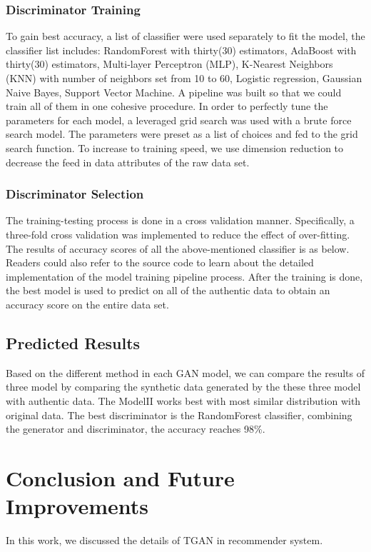 \documentclass[conference]{IEEEtran}
\begin{document}
\subsubsection{Discriminator Training}
To gain best accuracy, a list of classifier were used separately to fit the model, the classifier list includes: RandomForest with thirty(30) estimators, AdaBoost with thirty(30) estimators, Multi-layer Perceptron (MLP), K-Nearest Neighbors (KNN) with number of neighbors set from 10 to 60, Logistic regression, Gaussian Naive Bayes, Support Vector Machine. A pipeline was built so that we could train all of them in one cohesive procedure. In order to perfectly tune the parameters for each model, a leveraged grid search was used with a brute force search model. The parameters were preset as a list of choices and fed to the grid search function. To increase to training speed, we use dimension reduction to decrease the feed in data attributes of the raw data set. 

\subsubsection{Discriminator Selection}
The training-testing process is done in a cross validation manner. Specifically, a three-fold cross validation was implemented to reduce the effect of over-fitting. The results of accuracy scores of all the above-mentioned classifier is as below. Readers could also refer to the source code to learn about the detailed implementation of the model training pipeline process. 
After the training is done, the best model is used to predict on all of the authentic data to obtain an accuracy score on the entire data set. 

\subsection{Predicted Results}
Based on the different method in each GAN model, we can compare the results of three model by comparing the synthetic data generated by the these three model with authentic data. The ModelII works best with most similar distribution with original data. The best discriminator is the RandomForest classifier, combining the generator and discriminator, the accuracy reaches 98\%.

\section{Conclusion and Future Improvements}
In this work, we discussed the details of TGAN in recommender system.



\end{document}

